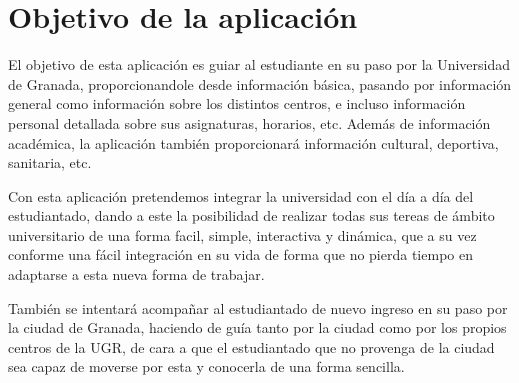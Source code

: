 \section{Objetivo de la aplicación}

El objetivo de esta aplicación es guiar al estudiante en su paso por la Universidad de Granada, proporcionandole desde información básica, pasando por información general como información sobre los distintos centros, e incluso información personal detallada sobre sus asignaturas, horarios, etc. Además de información académica, la aplicación también proporcionará información cultural, deportiva, sanitaria, etc.


Con esta aplicación pretendemos integrar la universidad con el día a día del estudiantado, dando a este la posibilidad de realizar todas sus tereas de ámbito universitario de una forma facil, simple, interactiva y dinámica, que a su vez conforme una fácil integración en su vida de forma que no pierda tiempo en adaptarse a esta nueva forma de trabajar.


También se intentará acompañar al estudiantado de nuevo ingreso en su paso por la ciudad de Granada, haciendo de guía tanto por la ciudad como por los propios centros de la UGR, de cara a que el estudiantado que no provenga de la ciudad sea capaz de moverse por esta y conocerla de una forma sencilla.


